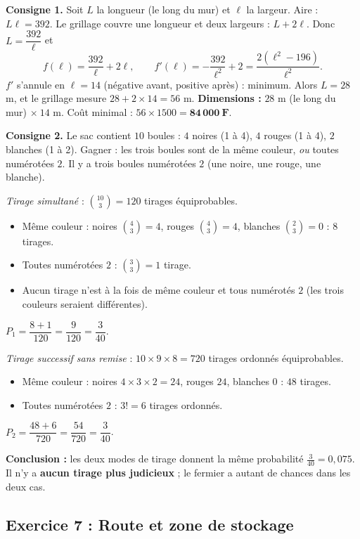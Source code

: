 \documentclass[11pt,a4paper]{article}
\begin{document}
\textbf{Consigne 1.} Soit $L$ la longueur (le long du mur) et $\ell$ la largeur. Aire : $L\ell=392$.
Le grillage couvre une longueur et deux largeurs : $L+2\ell$. Donc $L=\dfrac{392}{\ell}$ et
\[
f(\ell)=\frac{392}{\ell}+2\ell,\qquad f'(\ell)=-\frac{392}{\ell^2}+2=\frac{2(\ell^2-196)}{\ell^2}.
\]
$f'$ s'annule en $\ell=14$ (n\'egative avant, positive apr\`es) : minimum.
Alors $L=28$ m, et le grillage mesure $28+2\times14=56$ m.
\textbf{Dimensions :} $28$ m (le long du mur) $\times\ 14$ m. Co\^ut minimal : $56\times1500=\mathbf{84\,000\ F}$.

\medskip\noindent\textbf{Consigne 2.} Le sac contient $10$ boules : $4$ noires (1 \`a 4), $4$ rouges (1 \`a 4), $2$ blanches (1 \`a 2).
Gagner : les trois boules sont de la m\^eme couleur, \emph{ou} toutes num\'erot\'ees $2$.
Il y a trois boules num\'erot\'ees $2$ (une noire, une rouge, une blanche).

\medskip\emph{Tirage simultan\'e} : $\binom{10}{3}=120$ tirages \'equiprobables.
\begin{itemize}
  \item M\^eme couleur : noires $\binom43=4$, rouges $\binom43=4$, blanches $\binom23=0$ : $8$ tirages.
  \item Toutes num\'erot\'ees $2$ : $\binom33=1$ tirage.
  \item Aucun tirage n'est \`a la fois de m\^eme couleur et tous num\'erot\'es $2$ (les trois couleurs seraient diff\'erentes).
\end{itemize}
$P_1=\dfrac{8+1}{120}=\dfrac{9}{120}=\dfrac{3}{40}$.

\medskip\emph{Tirage successif sans remise} : $10\times9\times8=720$ tirages ordonn\'es \'equiprobables.
\begin{itemize}
  \item M\^eme couleur : noires $4\times3\times2=24$, rouges $24$, blanches $0$ : $48$ tirages.
  \item Toutes num\'erot\'ees $2$ : $3!=6$ tirages ordonn\'es.
\end{itemize}
$P_2=\dfrac{48+6}{720}=\dfrac{54}{720}=\dfrac{3}{40}$.

\textbf{Conclusion :} les deux modes de tirage donnent la m\^eme probabilit\'e $\frac{3}{40}=0{,}075$. Il n'y a
\textbf{aucun tirage plus judicieux} ; le fermier a autant de chances dans les deux cas.

\subsection{Exercice 7 : Route et zone de stockage}
\end{document}
